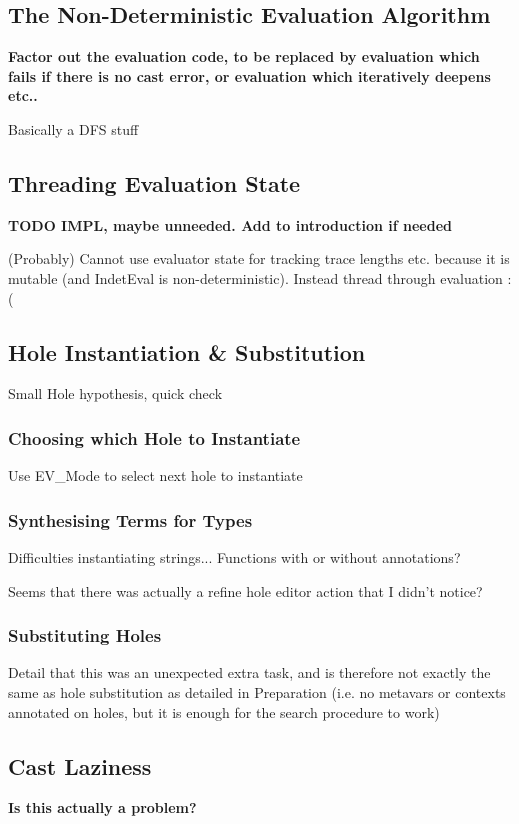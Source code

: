 \subsection{The Non-Deterministic Evaluation Algorithm}
\label{sec:IndetEvalAlgorithm}
\textbf{Factor out the evaluation code, to be replaced by evaluation which fails if there is no cast error, or evaluation which iteratively deepens etc..}

Basically a DFS stuff


\subsection{Threading Evaluation State}
\textbf{TODO IMPL, maybe unneeded. Add to introduction if needed}

(Probably) Cannot use evaluator state for tracking trace lengths etc. because it is mutable (and IndetEval is non-deterministic). Instead thread through evaluation :(

\subsection{Hole Instantiation \& Substitution}\label{sec:HoleInstantiation}
Small Hole hypothesis, quick check


\subsubsection{Choosing which Hole to Instantiate}
Use EV\_Mode to select next hole to instantiate

\subsubsection{Synthesising Terms for Types}
Difficulties instantiating strings...
Functions with or without annotations?

Seems that there was actually a refine hole editor action that I didn't notice?

\subsubsection{Substituting Holes}\label{sec:HoleSubstitutionImplementation}
Detail that this was an unexpected extra task, and is therefore not exactly the same as hole substitution as detailed in Preparation (i.e. no metavars or contexts annotated on holes, but it is enough for the search procedure to work)

\subsection{Cast Laziness}\label{sec:CastLaziness}
\textbf{Is this actually a problem?}

